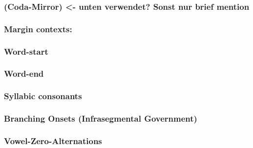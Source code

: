 \subsubsection{(Coda-Mirror) <- unten verwendet? Sonst nur brief mention}
\subsubsection{Margin contexts:}
\subsubsection{Word-start \ctx{\#\_}}\label{intro:obj:word start}
\begin{structure}{}
  \wordstart

\end{structure}


\subsubsection{Word-end \ctx{\_\#}}\label{intro:obj:word end}
\subsubsection{Syllabic consonants}
\subsubsection{Branching Onsets (Infrasegmental Government)}
\subsubsection{Vowel-Zero-Alternations}